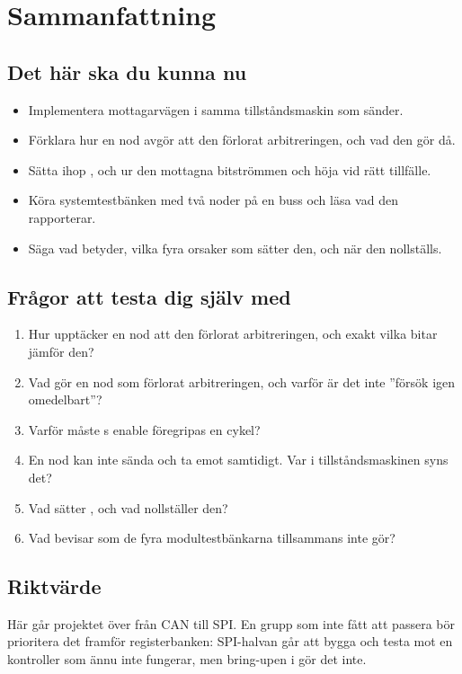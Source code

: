 
\section{Sammanfattning}
\label{c17:sec:review}

\subsection*{Det här ska du kunna nu}
\begin{itemize}
  \item Implementera mottagarvägen i samma tillståndsmaskin som sänder.
  \item Förklara hur en nod avgör att den förlorat arbitreringen, och vad den gör då.
  \item Sätta ihop ,  och  ur den mottagna bitströmmen och
    höja  vid rätt tillfälle.
  \item Köra systemtestbänken med två noder på en buss och läsa vad den rapporterar.
  \item Säga vad  betyder, vilka fyra orsaker som sätter den, och när den nollställs.
\end{itemize}

\subsection*{Frågor att testa dig själv med}
\begin{enumerate}
  \item Hur upptäcker en nod att den förlorat arbitreringen, och exakt vilka bitar jämför den?
  \item Vad gör en nod som förlorat arbitreringen, och varför är det inte ”försök igen omedelbart”?
  \item Varför måste s enable föregripas en cykel?
  \item En nod kan inte sända och ta emot samtidigt. Var i tillståndsmaskinen syns det?
  \item Vad sätter , och vad nollställer den?
  \item Vad bevisar  som de fyra modultestbänkarna tillsammans inte gör?
\end{enumerate}

\subsection*{Riktvärde}
Här går projektet över från CAN till SPI. En grupp som inte fått  att passera
bör prioritera det framför registerbanken: SPI-halvan går att bygga och testa mot en kontroller som
ännu inte fungerar, men bring-upen i  gör det inte.

